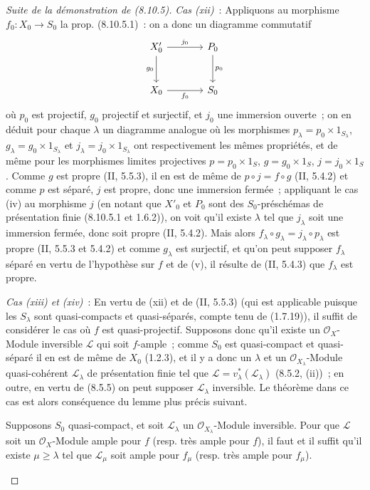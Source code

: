 \begin{proof}[Suite de la démonstration de (8.10.5)]
\emph{Cas (xii)}~: Appliquons au morphisme $f_0:X_0\to S_0$ la prop.
(8.10.5.1)~: on a donc un diagramme commutatif
\[
\begin{tikzcd}[column sep=large,row sep=large]
X'_0 \arrow[r,"j_0"] \arrow[d,"g_0"'] & P_0 \arrow[d,"p_0"] \\
X_0 \arrow[r,"f_0"'] & S_0
\end{tikzcd}
\]
où $p_0$ est projectif, $g_0$ projectif et surjectif, et $j_0$ une immersion
ouverte~; on en déduit pour chaque $\lambda$ un diagramme analogue où les
morphismes $p_\lambda=p_0\times1_{S_\lambda}$,
$g_\lambda=g_0\times1_{S_\lambda}$ et $j_\lambda=j_0\times1_{S_\lambda}$ ont
respectivement les mêmes propriétés, et de même pour les morphismes limites
projectives $p=p_0\times1_S$, $g=g_0\times1_S$, $j=j_0\times1_S$. Comme $g$
est propre (II, 5.5.3), il en est de même de $p\circ j=f\circ g$ (II, 5.4.2)
et comme $p$ est séparé, $j$ est propre, donc une immersion fermée~;
appliquant le cas (iv) au morphisme $j$ (en notant que $X'_0$ et $P_0$ sont
des $S_0$-préschémas de présentation finie (8.10.5.1 et 1.6.2)), on voit
qu'il existe $\lambda$ tel que $j_\lambda$ soit une immersion fermée, donc
soit propre (II, 5.4.2). Mais alors
$f_\lambda\circ g_\lambda=j_\lambda\circ p_\lambda$ est propre (II, 5.5.3 et
5.4.2) et comme $g_\lambda$ est surjectif, et qu'on peut supposer $f_\lambda$
séparé en vertu de l'hypothèse sur $f$ et de (v), il résulte de (II, 5.4.3)
que $f_\lambda$ est propre.

\emph{Cas (xiii) et (xiv)}~: En vertu de (xii) et de (II, 5.5.3) (qui est
applicable puisque les $S_\lambda$ sont quasi-compacts et quasi-séparés,
compte tenu de (1.7.19)), il suffit de
considérer le cas où $f$ est quasi-projectif. Supposons donc qu'il existe un
$\mathcal O_X$-Module inversible $\mathcal L$ qui soit $f$-ample~; comme $S_0$
est quasi-compact et quasi-séparé il en est de même de $X_0$ (1.2.3), et il y
a donc un $\lambda$ et un $\mathcal O_{X_\lambda}$-Module quasi-cohérent
$\mathcal L_\lambda$ de présentation finie tel que
$\mathcal L=v_\lambda^*(\mathcal L_\lambda)$ (8.5.2, (ii))~; en outre, en
vertu de (8.5.5) on peut supposer $\mathcal L_\lambda$ inversible. Le théorème
dans ce cas est alors conséquence du lemme plus précis suivant.

\begin{lemma}[8.10.5.2]
\label{IV.8.10.5.2-fr}
Supposons $S_0$ quasi-compact, et soit $\mathcal L_\lambda$ un
$\mathcal O_{X_\lambda}$-Module inversible. Pour que $\mathcal L$ soit un
$\mathcal O_X$-Module ample pour $f$ (resp. très ample pour $f$), il faut et
il suffit qu'il existe $\mu\geq\lambda$ tel que $\mathcal L_\mu$ soit ample
pour $f_\mu$ (resp. très ample pour $f_\mu$).
\end{lemma}


\end{proof}

